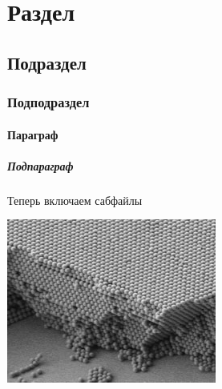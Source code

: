 \documentclass[a4paper]{article}
\begin{document}
	\tableofcontents
	\section{Раздел}
	\blindtext
	\subsection{Подраздел}
	\blindtext
	\subsubsection{Подподраздел}
	\blindtext
	\paragraph{Параграф}
	\blindtext
	\subparagraph{Подпараграф}
	\blindtext
	
	\newpage
	
	\vfill
	
	Теперь включаем сабфайлы
	
	\vfill
	
	\newpage
	
	
	\includegraphics{images/sample_pic.png}
	
	\tableofcontents
	
	
	
	\nocite{*}
\end{document}

